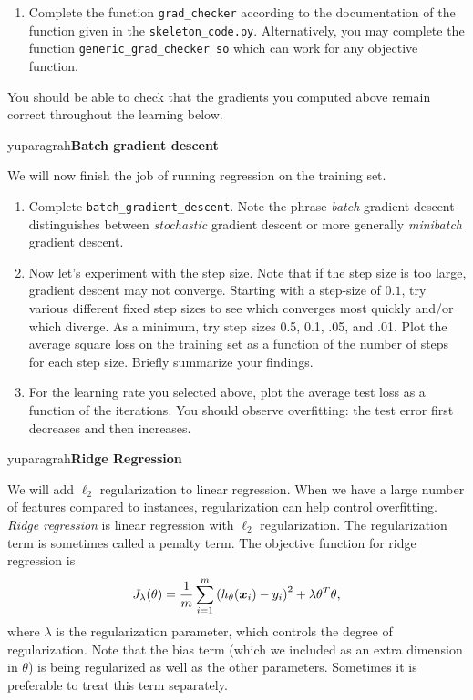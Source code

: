\documentclass{article}
\begin{document}
\begin{enumerate}
\setcounter{enumi}{\value{saveenum}}
\item Complete the function \texttt{grad\_checker} according to the documentation of the function given in the \texttt{skeleton\_code.py}. Alternatively, you may complete the function \texttt{generic\_grad\_checker
so} which can work for any objective function. 

\setcounter{saveenum}{\value{enumi}}
\end{enumerate}
You should be able to check that the gradients you computed above remain correct throughout the learning below.

yuparagrah{\bf Batch gradient descent}

We will now finish the job of
running regression on the training set. 

\begin{enumerate}
\setcounter{enumi}{\value{saveenum}}
\item Complete \texttt{batch\_gradient\_descent}. Note the phrase \emph{batch} gradient descent distinguishes between \emph{stochastic} gradient
descent or more generally \emph{minibatch} gradient descent. 

\item Now let's experiment with the step size. Note that if the step size
is too large, gradient descent may not converge. Starting with a step-size of $0.1$, try various different fixed
step sizes to see which converges most quickly and/or which diverge.
As a minimum, try step sizes 0.5, 0.1, .05, and .01. Plot the average square loss on the training set as a function of the number of steps for
each step size. Briefly summarize your findings. 

\item For the learning rate you selected above, plot the average test loss as a function of the iterations. You should observe overfitting: the test error first decreases and then increases.

\setcounter{saveenum}{\value{enumi}}
\end{enumerate}

\vspace{0.3cm}
yuparagrah{\bf Ridge Regression}

We will add $\ell_2$ regularization to linear regression. When we have a large number of features compared to instances, regularization
can help control overfitting. \emph{Ridge regression} is linear regression
with $\ell_{2}$ regularization. The regularization term is sometimes
called a penalty term. The objective function for ridge regression
is
\[
J_\lambda(\theta)=\frac{1}{m}\sum_{i=1}^{m}\left(h_{\theta}(\boldsymbol{x}_{i})-y_{i}\right)^{2}+\lambda\theta^{T}\theta,
\]
where $\lambda$ is the regularization parameter, which controls the
degree of regularization. Note that the bias term (which we included as an extra dimension in $\theta$) is being regularized
as well as the other parameters. Sometimes it is preferable to treat this term separately.
\end{document}
